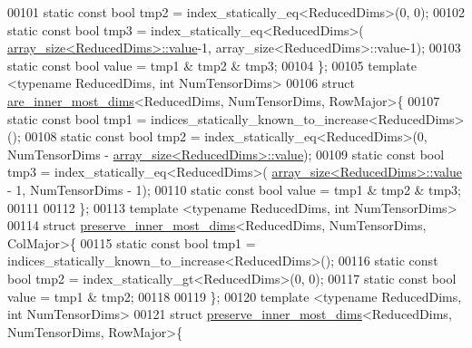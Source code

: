 \begin{DoxyCode}
00101   \textcolor{keyword}{static} \textcolor{keyword}{const} \textcolor{keywordtype}{bool} tmp2 = index\_statically\_eq<ReducedDims>(0, 0);
00102   \textcolor{keyword}{static} \textcolor{keyword}{const} \textcolor{keywordtype}{bool} tmp3 = index\_statically\_eq<ReducedDims>(
      \hyperlink{struct_eigen_1_1internal_1_1array__size}{array\_size<ReducedDims>::value}-1, array\_size<ReducedDims>::value-1);
00103   \textcolor{keyword}{static} \textcolor{keyword}{const} \textcolor{keywordtype}{bool} value = tmp1 & tmp2 & tmp3;
00104 \};
00105 \textcolor{keyword}{template} <\textcolor{keyword}{typename} ReducedDims, \textcolor{keywordtype}{int} NumTensorDims>
00106 \textcolor{keyword}{struct }\hyperlink{struct_eigen_1_1internal_1_1are__inner__most__dims}{are\_inner\_most\_dims}<ReducedDims, NumTensorDims, RowMajor>\{
00107   \textcolor{keyword}{static} \textcolor{keyword}{const} \textcolor{keywordtype}{bool} tmp1 = indices\_statically\_known\_to\_increase<ReducedDims>();
00108   \textcolor{keyword}{static} \textcolor{keyword}{const} \textcolor{keywordtype}{bool} tmp2 = index\_statically\_eq<ReducedDims>(0, NumTensorDims - 
      \hyperlink{struct_eigen_1_1internal_1_1array__size}{array\_size<ReducedDims>::value});
00109   \textcolor{keyword}{static} \textcolor{keyword}{const} \textcolor{keywordtype}{bool} tmp3 = index\_statically\_eq<ReducedDims>(
      \hyperlink{struct_eigen_1_1internal_1_1array__size}{array\_size<ReducedDims>::value} - 1, NumTensorDims - 1);
00110   \textcolor{keyword}{static} \textcolor{keyword}{const} \textcolor{keywordtype}{bool} value = tmp1 & tmp2 & tmp3;
00111 
00112 \};
00113 \textcolor{keyword}{template} <\textcolor{keyword}{typename} ReducedDims, \textcolor{keywordtype}{int} NumTensorDims>
00114 \textcolor{keyword}{struct }\hyperlink{struct_eigen_1_1internal_1_1preserve__inner__most__dims}{preserve\_inner\_most\_dims}<ReducedDims, NumTensorDims, ColMajor>\{
00115   \textcolor{keyword}{static} \textcolor{keyword}{const} \textcolor{keywordtype}{bool} tmp1 = indices\_statically\_known\_to\_increase<ReducedDims>();
00116   \textcolor{keyword}{static} \textcolor{keyword}{const} \textcolor{keywordtype}{bool} tmp2 = index\_statically\_gt<ReducedDims>(0, 0);
00117   \textcolor{keyword}{static} \textcolor{keyword}{const} \textcolor{keywordtype}{bool} value = tmp1 & tmp2;
00118 
00119 \};
00120 \textcolor{keyword}{template} <\textcolor{keyword}{typename} ReducedDims, \textcolor{keywordtype}{int} NumTensorDims>
00121 \textcolor{keyword}{struct }\hyperlink{struct_eigen_1_1internal_1_1preserve__inner__most__dims}{preserve\_inner\_most\_dims}<ReducedDims, NumTensorDims, RowMajor>\{

\end{DoxyCode}
